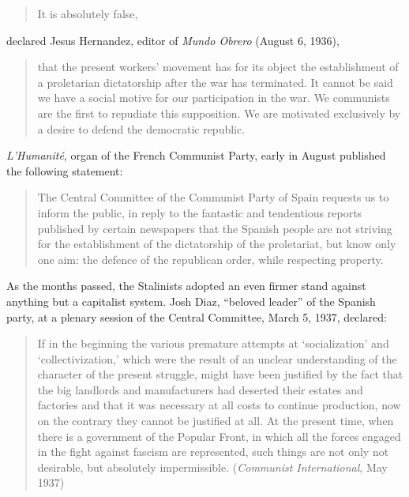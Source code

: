 \begin{quotation}
  It is absolutely false,
\end{quotation}
declared Jesus Hernandez, editor of \emph{Mundo Obrero} (August 6, 1936),

\begin{quotation}
  \noindent
  that the present workers’ movement has for its object the establishment of a proletarian dictatorship after the war has terminated. It cannot be said we have a social motive for our participation in the war. We communists are the first to repudiate this supposition. We are motivated exclusively by a desire to defend the democratic republic.
\end{quotation}

\emph{L’Humanité}, organ of the French Communist Party, early in August published the following statement:

\begin{quotation}
  The Central Committee of the Communist Party of Spain requests us to inform the public, in reply to the fantastic and tendentious reports published by certain newspapers that the Spanish people are not striving for the establishment of the dictatorship of the proletariat, but know only one aim: the defence of the republican order, while respecting property.
\end{quotation}

As the months passed, the Stalinists adopted an even firmer stand against anything but a capitalist system. Josh Diaz, ``beloved leader'' of the Spanish party, at a plenary session of the Central Committee, March 5, 1937, declared:

\begin{quotation}
  If in the beginning the various premature attempts at ‘socialization’ and ‘collectivization,’ which were the result of an unclear understanding of the character of the present struggle, might have been justified by the fact that the big landlords and manufacturers had deserted their estates and factories and that it was necessary at all costs to continue production, now on the contrary they cannot be justified at all. At the present time, when there is a government of the Popular Front, in which all the forces engaged in the fight against fascism are represented, such things are not only not desirable, but absolutely impermissible. (\emph{Communist International}, May 1937)
\end{quotation}


